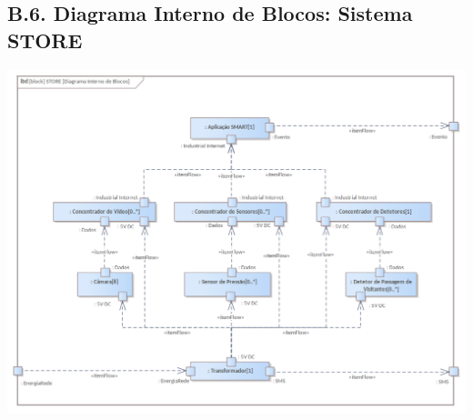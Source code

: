 \documentclass[12pt,a4paper]{article}
\begin{document}
\begin{landscape}
	\section*{B.6. Diagrama Interno de Blocos: Sistema STORE}
	\includegraphics[width=1.25\textwidth]{../iBD_STORE.png}
\end{landscape}
\end{document}
